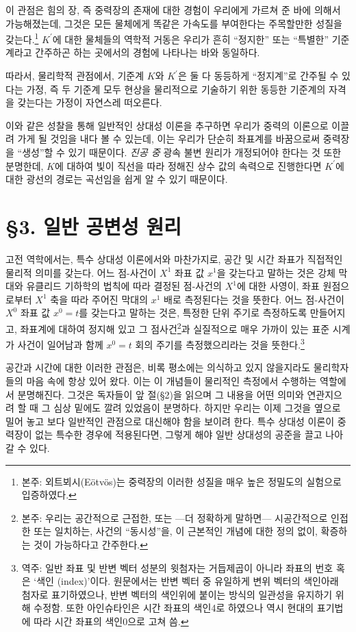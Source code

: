 이 관점은 힘의 장, 즉 중력장의 존재에 대한 경험이 우리에게 가르쳐 준 바에 의해서 가능해졌는데, 그것은 모든 물체에게 똑같은 가속도를 부여한다는 주목할만한 성질을 갖는다.\footnote{본주: 외트뵈시(E\"otv\"os)는 중력장의 이러한 성질을 매우 높은 정밀도의 실험으로 입증하였다.} $K^{\prime}$에 대한 물체들의 역학적 거동은 우리가 흔히 ``정지한'' 또는 ``특별한'' 기준계라고 간주하곤 하는 곳에서의 경험에 나타나는 바와 동일하다.

따라서, 물리학적 관점에서, 기준계 $ K $와 $ K^\prime $은 둘 다 동등하게 ``정지계''로 간주될 수 있다는 가정, 즉 두 기준계 모두 현상을 물리적으로 기술하기 위한 동등한 기준계의 자격을 갖는다는 가정이 자연스레 떠오른다.

이와 같은 성찰을 통해 일반적인 상대성 이론을 추구하면 우리가 중력의 이론으로 이끌려 가게 될 것임을 내다 볼 수 있는데, 이는 우리가 단순히 좌표계를 바꿈으로써 중력장을 ``생성''할 수 있기 때문이다. \emph{진공 중} 광속 불변 원리가 개정되어야 한다는 것 또한 분명한데, $K$에 대하여 빛이 직선을 따라 정해진 상수 값의 속력으로 진행한다면 $K^{\prime}$에 대한 광선의 경로는 곡선임을 쉽게 알 수 있기 때문이다. 

\section*{\S 3. 일반 공변성 원리}
\newcommand{\Index}{색인}
고전 역학에서는, 특수 상대성 이론에서와 마찬가지로, 공간 및 시간 좌표가 직접적인 물리적 의미를 갖는다. 어느 점-사건이 $X^1$ 좌표 값 $x^1$을 갖는다고 말하는 것은 강체 막대와 유클리드 기하학의  법칙에 따라 결정된 점-사건의 $ X^1 $에 대한 사영이, 좌표 원점으로부터 $ X^1 $ 축을 따라 주어진 막대의 $ x^1 $ 배로 측정된다는 것을 뜻한다.  어느 점-사건이 $ X^0 $ 좌표 값 $ x^0=t $를 갖는다고 말하는 것은, 특정한 단위 주기로 측정하도록 만들어지고, 좌표계에 대하여 정지해 있고 그 점사건\footnote{본주: 우리는 공간적으로 근접한, 또는 ---더 정확하게 말하면--- 시공간적으로 인접한 또는 일치하는, 사건의 ``동시성''을, 이 근본적인 개념에 대한 정의 없이, 확증하는 것이 가능하다고 간주한다.}과 실질적으로 매우 가까이 있는 표준 시계가 사건이 일어남과 함께 $ x^0=t $ 회의 주기를 측정했으리라는 것을 뜻한다.\footnote{역주: 일반 좌표 및 반변 벡터 성분의 윗첨자는 거듭제곱이 아니라 좌표의 번호 혹은 `\Index{} (index)'이다. 원문에서는 반변 벡터 중 유일하게 변위 벡터의 \Index\를 아래 첨자로 표기하였으나, 반변 벡터의 \Index\을 위에 붙이는 방식의 일관성을 유지하기 위해 수정함. 또한 아인슈타인은 시간 좌표의 \Index\를 4로 하였으나 역시 현대의 표기법에 따라 시간 좌표의 \Index\는 0으로 고쳐 씀.}

공간과 시간에 대한 이러한 관점은, 비록 평소에는 의식하고 있지 않을지라도 물리학자들의 마음 속에 항상 있어 왔다. 이는 이 개념들이 물리적인 측정에서 수행하는 역할에서 분명해진다. 그것은 독자들이 앞 절(\S 2)을 읽으며 그 내용을 어떤 의미와 연관지으려 할 때 그 심상 밑에도 깔려 있었음이 분명하다. 하지만 우리는 이제 그것을 옆으로 밀어 놓고 보다 일반적인 관점으로 대신해야 함을 보이려 한다.  특수 상대성 이론이 중력장이 없는 특수한 경우에 적용된다면, 그렇게 해야 일반 상대성의 공준을 끌고 나아갈 수 있다.

